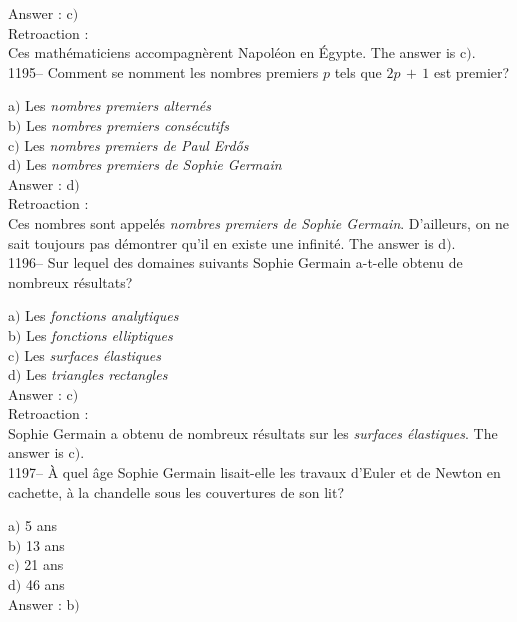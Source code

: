 ﻿\documentclass[letterpaper, 12pt]{article}
\begin{document}
Answer : c$)$\\

Retroaction : \\
Ces math\'ematiciens accompagn\`erent Napol\'eon en \'Egypte.
The answer is c$)$.\\

1195-- Comment se nomment les nombres premiers $p$ tels que
$2p\,+\,1$ est premier?

a$)$ Les {\sl nombres premiers altern\'es} \\
b$)$ Les {\sl nombres premiers cons\'ecutifs} \\
c$)$ Les {\sl nombres premiers de Paul Erd\H{o}s} \\
d$)$ Les {\sl nombres premiers de Sophie Germain}\\

Answer : d$)$\\

Retroaction : \\
Ces nombres sont appel\'es {\sl nombres premiers de Sophie Germain}.
D'ailleurs, on ne sait toujours pas d\'emontrer qu'il en existe une
infinit\'e.
The answer is d$)$.\\

1196-- Sur lequel des domaines suivants Sophie Germain a-t-elle
obtenu de nombreux r\'esultats?

a$)$ Les {\sl fonctions analytiques} \\
b$)$ Les {\sl fonctions elliptiques} \\
c$)$ Les {\sl surfaces \'elastiques} \\
d$)$ Les {\sl triangles rectangles}\\

Answer : c$)$\\

Retroaction : \\
Sophie Germain a obtenu de nombreux r\'esultats sur les {\sl
surfaces \'elastiques}.
The answer is c$)$.\\

1197-- \`A quel \^age Sophie Germain lisait-elle les travaux d'Euler
et de Newton en cachette, \`a la chandelle sous les couvertures de
son lit?

a$)$ 5 ans \\
b$)$ 13 ans \\
c$)$ 21 ans \\
d$)$ 46 ans\\

Answer : b$)$\\
\end{document}
